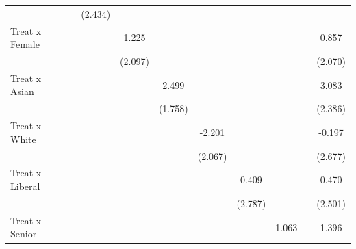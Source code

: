 \begin{table}[htbp]
\begin{tabular}{l*{10}{c}}
                                &                  &                  &  (2.434)         &                  &                  &                  &                  &                  &                  &                  \\
Treat x Female                  &                  &                  &                  &    1.225         &                  &                  &                  &                  &                  &    0.857         \\
                                &                  &                  &                  &  (2.097)         &                  &                  &                  &                  &                  &  (2.070)         \\
Treat x Asian                   &                  &                  &                  &                  &    2.499         &                  &                  &                  &                  &    3.083         \\
                                &                  &                  &                  &                  &  (1.758)         &                  &                  &                  &                  &  (2.386)         \\
Treat x White                   &                  &                  &                  &                  &                  &   -2.201         &                  &                  &                  &   -0.197         \\
                                &                  &                  &                  &                  &                  &  (2.067)         &                  &                  &                  &  (2.677)         \\
Treat x Liberal                 &                  &                  &                  &                  &                  &                  &    0.409         &                  &                  &    0.470         \\
                                &                  &                  &                  &                  &                  &                  &  (2.787)         &                  &                  &  (2.501)         \\
Treat x Senior                  &                  &                  &                  &                  &                  &                  &                  &    1.063         &                  &    1.396         \\

\end{tabular}
\end{table}
